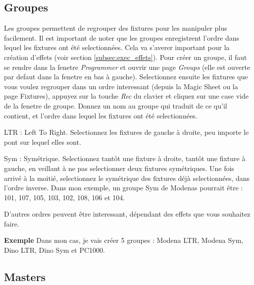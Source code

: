 \subsection{Groupes}
\label{subsec:prep_groupes}

Les groupes permettent de regrouper des fixtures pour les manipuler plus facilement.
\newline
Il est important de noter que les groupes enregistrent l'ordre dans lequel les fixtures ont été selectionnées.
Cela va s'averer important pour la création d'effets (voir section \ref{subsec:exec_effets}).
\newline
\newline
Pour créer un groupe, il faut se rendre dans la fenetre \textit{Programmer} et ouvrir une page \textit{Groups}
(elle est ouverte par defaut dans la fenetre en bas à gauche).
\newline
Selectionnez ensuite les fixtures que vous voulez regrouper dans un ordre interessant (depuis la Magic Sheet ou la page Fixtures), appuyez sur la touche \textit{Rec} du clavier et cliquez sur une case vide de la fenetre de groupe.
Donnez un nom au groupe qui traduit de ce qu'il contient, et l'ordre dans lequel les fixtures ont été selectionnées.
\newline
\newline
\begin{list}{-}{Ordres de selection utiles :}
    \item LTR : Left To Right. Selectionnez les fixtures de gauche à droite, peu importe le pont sur lequel elles sont.
    \item Sym : Symétrique. Selectionnez tantôt une fixture à droite, tantôt une fixture à gauche, en veillant à ne pas selectionner
deux fixtures symétriques. Une fois arrivé à la moitié, selectionnez le symétrique des fixtures déjà selectionnées, dans l'ordre inverse.
\newline
Dans mon exemple, un groupe Sym de Modenas pourrait être : 101, 107, 105, 103, 102, 108, 106 et 104.
    \item D'autres ordres peuvent être interessant, dépendant des effets que vous souhaitez faire.
\end{list}
\textbf{Exemple}
\newline
\newline
Dans mon cas, je vais créer 5 groupes : Modena LTR, Modena Sym, Dino LTR, Dino Sym et PC1000.

\subsection{Masters}
\label{subsec:prep_gm}

